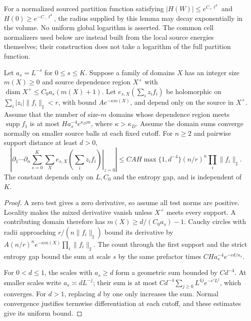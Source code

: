 \documentclass[11pt,letterpaper,reqno]{amsart}
\makeatletter
\numberwithin{equation}{section}
\theoremstyle{definition}
\newcommand{\ms@minorstart}{%
  \pushQED{\qed}\renewcommand{\qedsymbol}{$\blacksquare$}}
\newenvironment{lemma}[1][]{\ms@minorstart\ms@lemma[#1]}
  {\popQED\endms@lemma}
\theoremstyle{remark}
\makeatother
\begin{document}
For a normalized sourced partition function satisfying
$|H(W)|\le e^{C_+\ell^4}$ and $H(0)\ge e^{-C_-\ell^4}$, the
radius supplied by this lemma may decay exponentially in the
volume. No uniform global logarithm is asserted. The common cell
normalizers used below are instead built from the local source
energies themselves; their construction does not take a logarithm
of the full partition function.

\begin{samepage}
\begin{lemma}[Separated derivatives of local energies]
\label{si:lem-separated-energy}
Let $a_s=L^{-s}$ for $0\le s\le K$. Suppose a family of domains
$X$ has an integer size $m(X)\ge0$ and source dependence region
$X^+$ with
$\operatorname{diam}X^+\le C_0 a_s(m(X)+1)$. Let
$e_{s,X}(\sum_i z_i f_i)$ be holomorphic on
$\sum_i|z_i|\|f_i\|_\sharp<r$, with bound
$A e^{-\kappa m(X)}$, and depend only on the source in $X^+$.
Assume that the number of size-$m$ domains whose dependence
region meets $\operatorname{supp}f_1$ is at most
$H a_s^{-4} e^{\kappa_D m}$, where $\kappa>\kappa_D$.
Assume the domain sums converge normally on smaller source balls
at each fixed cutoff. For $n\ge2$ and pairwise support distance
at least $d>0$,
\begin{equation}\label{si:eq-separated-energy}
 \left|\left.\partial_1\cdots\partial_n
            \sum_{s=0}^K\sum_X e_{s,X}\!\left(\sum_i z_i f_i\right)
                  \right|_{z=0}\right|
 \le C A H\max\{1,d^{-4}\}(n/r)^n\prod_i\|f_i\|_\sharp.
\end{equation}
The constant depends only on $L,C_0$ and the entropy gap, and is
independent of $K$.
\end{lemma}
\end{samepage}
\begin{proof}
A zero test gives a zero derivative, so assume all test norms are
positive. Locality makes the mixed derivative vanish unless
$X^+$ meets every support. A contributing domain therefore has
$m(X)\ge d/(C_0a_s)-1$. Cauchy circles with radii approaching
$r/(n\|f_i\|_\sharp)$ bound its derivative by
$A(n/r)^n e^{-\kappa m(X)}\prod_i\|f_i\|_\sharp$.
The count through the first support and the strict entropy gap
bound the sum at scale $s$ by the same prefactor times
$C H a_s^{-4}e^{-c d/a_s}$.

For $0<d\le1$, the scales with $a_s\ge d$ form a geometric
sum bounded by $C d^{-4}$. At smaller scales write
$a_s\asymp d L^{-j}$; their sum is at most
$C d^{-4}\sum_{j\ge0}L^{4j}e^{-c' L^j}$, which converges.
For $d>1$, replacing $d$ by one only increases the sum.
Normal convergence justifies termwise differentiation at each
cutoff, and these estimates give its uniform bound.
\end{proof}
\end{document}
